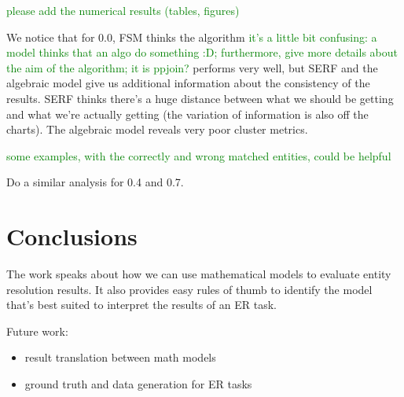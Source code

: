 \documentclass[11pt]{article}
\begin{document}
    \textcolor{green}{please add the numerical results (tables, figures)}

    We notice that for 0.0, FSM thinks the algorithm 
    \textcolor{green}{it's a little bit confusing: a model thinks that an algo do something :D; furthermore, give more details about the aim of the algorithm; it is ppjoin?} 
    performs very well, but SERF and the algebraic model give us additional information about the consistency of the results. 
    SERF thinks there's a huge distance between what we should be getting and what we're actually getting (the variation of information is also off the charts).
    The algebraic model reveals very poor cluster metrics.

    \textcolor{green}{some examples, with the correctly and wrong matched entities, could be helpful} 

    Do a similar analysis for 0.4 and 0.7.

    \section[conclusion]{Conclusions}\label{section:conclusions}

    The work speaks about how we can use mathematical models to evaluate entity resolution results. It also provides easy rules of thumb to identify the model that's best suited to interpret the results of an ER task.
    
    Future work:
    \begin{itemize}
        \item result translation between math models
        \item ground truth and data generation for ER tasks
    \end{itemize}

    
\end{document}
